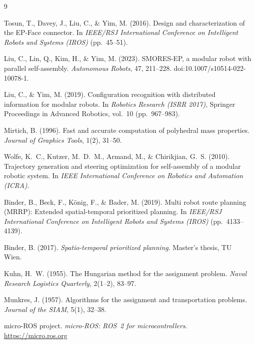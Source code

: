 \documentclass[12pt,a4paper]{article}
\begin{document}
% 

\renewcommand{\refname}{Additional References}
\begin{thebibliography}{9}

Tosun, T., Davey, J., Liu, C., \& Yim, M. (2016). Design and characterization
of the EP-Face connector. In \textit{IEEE/RSJ International Conference on
Intelligent Robots and Systems (IROS)} (pp.\ 45--51).

Liu, C., Lin, Q., Kim, H., \& Yim, M. (2023). SMORES-EP, a modular robot with
parallel self-assembly. \textit{Autonomous Robots}, 47, 211--228.
doi:10.1007/s10514-022-10078-1.

Liu, C., \& Yim, M. (2019). Configuration recognition with distributed
information for modular robots. In \textit{Robotics Research (ISRR 2017)},
Springer Proceedings in Advanced Robotics, vol.\ 10 (pp.\ 967--983).

Mirtich, B. (1996). Fast and accurate computation of polyhedral mass properties.
\textit{Journal of Graphics Tools}, 1(2), 31--50.

Wolfe, K.\ C., Kutzer, M.\ D.\ M., Armand, M., \& Chirikjian, G.\ S. (2010).
Trajectory generation and steering optimization for self-assembly of a modular
robotic system. In \textit{IEEE International Conference on Robotics and
Automation (ICRA)}.

Binder, B., Beck, F., K\"onig, F., \& Bader, M. (2019). Multi robot route
planning (MRRP): Extended spatial-temporal prioritized planning. In
\textit{IEEE/RSJ International Conference on Intelligent Robots and Systems
(IROS)} (pp.\ 4133--4139).

Binder, B. (2017). \textit{Spatio-temporal prioritized planning}. Master's
thesis, TU Wien.

Kuhn, H.\ W. (1955). The Hungarian method for the assignment problem.
\textit{Naval Research Logistics Quarterly}, 2(1--2), 83--97.

Munkres, J. (1957). Algorithms for the assignment and transportation problems.
\textit{Journal of the SIAM}, 5(1), 32--38.

micro-ROS project. \textit{micro-ROS: ROS~2 for microcontrollers}.
\url{https://micro.ros.org}

\end{thebibliography}
\end{document}
